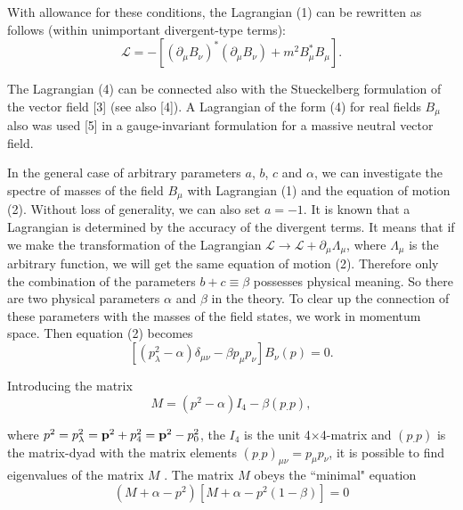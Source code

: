 \documentclass[a4paper,12pt]{article}
\begin{document}
With allowance for these conditions, the Lagrangian (1) can be
rewritten as follows (within unimportant divergent-type terms):
\begin{equation}
\mathcal{L}=-\left[ \left( \partial _\mu B_\nu \right) ^{*}\left(
\partial _\mu B_\nu \right) +m^2B_\mu ^{*}B_\mu \right].  \label{4}
\end{equation}

The Lagrangian (4) can be connected also with the Stueckelberg
formulation of the vector field [3] (see also [4]). A Lagrangian
of the form (4) for real fields $B_\mu$ also was used [5] in a
gauge-invariant formulation for a massive neutral vector field.

In the general case of arbitrary parameters $a$, $b$, $c$ and
$\alpha$, we can investigate the spectre of masses of the field
$B_\mu $ with Lagrangian (1) and the equation of motion (2).
Without loss of generality, we can also set $a=-1$. It is known
that a Lagrangian is determined by the accuracy of the divergent
terms. It means that if we make the transformation of the
Lagrangian $\mathcal{L}\rightarrow \mathcal{L}+\partial _\mu
\Lambda _\mu $, where $\Lambda _\mu $ is the arbitrary function,
we will get the same equation of motion (2). Therefore only the
combination of the parameters $b+c\equiv \beta $ possesses
physical meaning. So there are two physical parameters $\alpha $
and $\beta $ in the theory. To clear up the connection of these
parameters with the masses of the field states, we work in
momentum space. Then equation (2) becomes
\begin{equation}
\left[ \left( p_\lambda ^2-\alpha \right) \delta _{\mu \nu }-\beta
p_\mu p_\nu \right] B_\nu \left( p\right) =0.  \label{5}
\end{equation}

Introducing the matrix
\begin{equation}
M=\left( p^2-\alpha \right) I_4-\beta \left( p_{\cdot }p\right),
\label{6}
\end{equation}

where $p^2=p_\lambda ^2={\bf p}^2+p_4^2={\bf p}^2-p_0^2$, the
$I_4$ is the unit 4$\times $4-matrix and $ \left( p_{\cdot
}p\right) $ is the matrix-dyad with the matrix elements $ \left(
p_{\cdot }p\right) _{\mu \nu }=p_\mu p_\nu $, it is possible to
find eigenvalues of the matrix $M$ . The matrix $M$ obeys the
``minimal" equation
\begin{equation}
\left( M+\alpha -p^2\right) \left[ M+\alpha -p^2\left( 1-\beta
\right) \right] =0  \label{7}
\end{equation}
\end{document}
